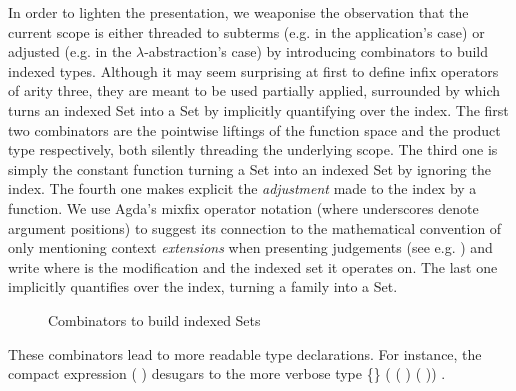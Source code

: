 In order to lighten the presentation, we weaponise the observation that the
current scope is either threaded to subterms (e.g. in the application's case)
or adjusted (e.g. in the $\lambda$-abstraction's case) by introducing combinators
to build indexed types. Although it may seem surprising at first to define
infix operators of arity three, they are meant to be used partially applied,
surrounded by \AF{[\_]} which turns an indexed Set into a Set by implicitly
quantifying over the index. The first two combinators are the pointwise liftings
of the function space and the product type respectively, both silently threading
the underlying scope. The third one is simply the constant function turning a Set
into an indexed Set by ignoring the index. The fourth one makes explicit
the \emph{adjustment} made to the index by a function. We use Agda's mixfix
operator notation (where underscores denote argument positions) to suggest its
connection to the mathematical convention of only mentioning context \emph{extensions}
when presenting judgements (see e.g. \cite{martin1982constructive}) and write
   where  is the modification and  the indexed set
it operates on. The last one implicitly quantifies over the index,
turning a family into a Set.

\begin{figure}[h]
\begin{minipage}{0.45\textwidth}
\end{minipage}\hspace{2em}
\begin{minipage}{0.45\textwidth}
\end{minipage}

\begin{minipage}{0.25\textwidth}
\end{minipage}
\begin{minipage}{0.40\textwidth}
\end{minipage}\hspace{2em}
\begin{minipage}{0.25\textwidth}
\end{minipage}
\caption{Combinators to build indexed Sets}\label{figure:indexed}
\end{figure}


These combinators lead to more readable type declarations. For instance,
the compact expression
\AF{[}   (  )   \AF{]}
desugars to the more verbose type
 \{\}  ( ( )   ( ))   .

